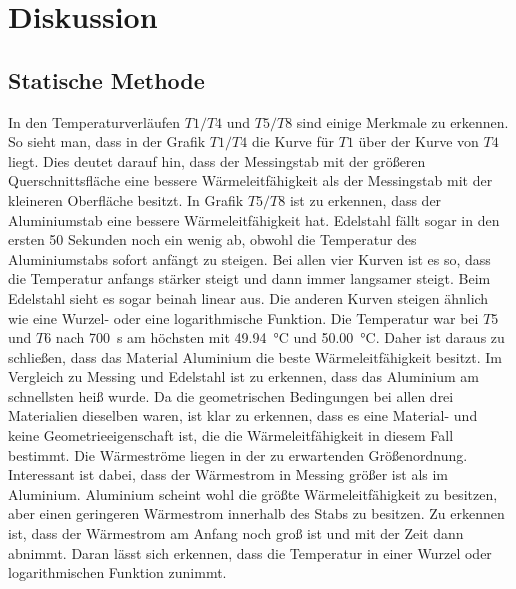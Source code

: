 \section{Diskussion}
\label{sec:Diskussion}

\subsection{Statische Methode}
In den Temperaturverläufen $T1/T4$ und $T5/T8$ sind einige Merkmale zu erkennen. 
So sieht man, dass in der Grafik $T1/T4$ die Kurve für $T1$ über der Kurve von $T4$ liegt. Dies deutet darauf hin, dass der Messingstab mit 
der größeren Querschnittsfläche eine bessere Wärmeleitfähigkeit als der Messingstab mit der kleineren Oberfläche besitzt. 
In Grafik $T5/T8$ ist zu erkennen, dass der Aluminiumstab eine bessere Wärmeleitfähigkeit hat. Edelstahl fällt sogar in den ersten 50 Sekunden 
noch ein wenig ab, obwohl die Temperatur des Aluminiumstabs sofort anfängt zu steigen. 
Bei allen vier Kurven ist es so, dass die Temperatur anfangs stärker steigt und dann immer langsamer steigt. Beim Edelstahl sieht es sogar 
beinah linear aus. Die anderen Kurven steigen ähnlich wie eine Wurzel- oder eine logarithmische Funktion.
\newline 
Die Temperatur war bei $T5$ und $T6$ nach \SI{700}{\second} am höchsten mit \SI{49.94}{\degreeCelsius} und \SI{50.00}{\degreeCelsius}. Daher 
ist daraus zu schließen, dass das Material Aluminium die beste Wärmeleitfähigkeit besitzt. 
Im Vergleich zu Messing und Edelstahl ist zu erkennen, dass das Aluminium  am schnellsten heiß wurde. Da die geometrischen
Bedingungen bei allen drei Materialien dieselben waren, ist klar zu erkennen, dass es eine Material- und keine
Geometrieeigenschaft ist, die die Wärmeleitfähigkeit in diesem Fall bestimmt.
\newline
Die Wärmeströme liegen in der zu erwartenden Größenordnung. Interessant ist dabei, dass der Wärmestrom in Messing größer ist als im Aluminium. 
Aluminium scheint wohl die größte Wärmeleitfähigkeit zu besitzen, aber einen geringeren Wärmestrom innerhalb des Stabs zu besitzen. 
Zu erkennen ist, dass der Wärmestrom am Anfang noch groß ist und mit der Zeit dann abnimmt. Daran lässt sich erkennen, dass die Temperatur 
in einer Wurzel oder logarithmischen Funktion zunimmt.
\newline

